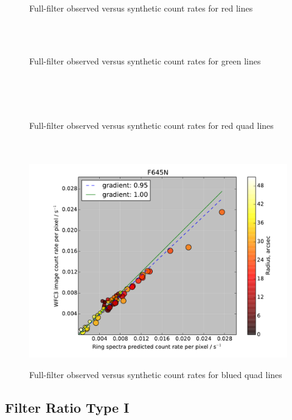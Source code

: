 \documentclass[preprint, 12pt]{aastex}
\begin{document}
\begin{figure}[p]
  \centering
  \\
  \\
  \caption{Full-filter observed versus synthetic count rates for red lines}
  \label{fig:multicorrel-red}
\end{figure}

\begin{figure}[p]
  \centering
  \\
  \\
  \caption{Full-filter observed versus synthetic count rates for green lines}
  \label{fig:multicorrel-green}
\end{figure}

\begin{figure}[p]
  \centering
  \\
  \\
  \\
  \caption{Full-filter observed versus synthetic count rates for red quad lines}
  \label{fig:multicorrel-red-quad}
\end{figure}
\begin{figure}[p]
  \centering
  \\
  \\
  \includegraphics[width=0.33\linewidth]{ring-F645N-absolute}%
  \caption{Full-filter observed versus synthetic count rates for blued quad lines}
  \label{fig:multicorrel-blue-quad}
\end{figure}

\subsection{Filter Ratio Type I}
\label{sec:typeI}
\end{document}
